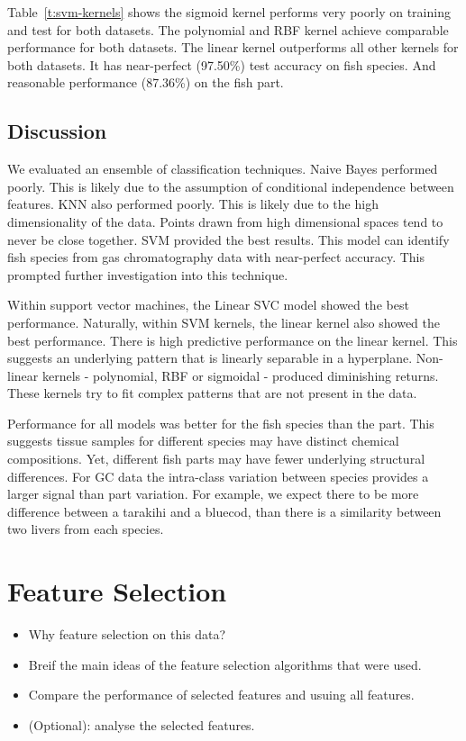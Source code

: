 \documentclass[runningheads]{llncs}
\begin{document}
Table~\ref{t:svm-kernels} shows the sigmoid kernel performs very poorly on training and test for both datasets.
The polynomial and RBF kernel achieve comparable performance for both datasets.
The linear kernel outperforms all other kernels for both datasets.
It has near-perfect (97.50\%) test accuracy on fish species.
And reasonable performance (87.36\%) on the fish part.

\subsection{Discussion}
\label{sec:results-classification-discussion}

We evaluated an ensemble of classification techniques.
Naive Bayes performed poorly.
This is likely due to the assumption of conditional independence between features.
KNN also performed poorly. This is likely due to the high dimensionality of the data.
Points drawn from high dimensional spaces tend to never be close together.
SVM provided the best results.
This model can identify fish species from gas chromatography data with near-perfect accuracy.
This prompted further investigation into this technique.

Within support vector machines, the Linear SVC model showed the best performance.
Naturally, within SVM kernels, the linear kernel also showed the best performance.
There is high predictive performance on the linear kernel.
This suggests an underlying pattern that is linearly separable in a hyperplane.
Non-linear kernels - polynomial, RBF or sigmoidal - produced diminishing returns.
These kernels try to fit complex patterns that are not present in the data.

Performance for all models was better for the fish species than the part.
This suggests tissue samples for different species may have distinct chemical compositions.
Yet, different fish parts may have fewer underlying structural differences.
For GC data the intra-class variation between species provides a larger signal than part variation.
For example, we expect there to be more difference between a tarakihi and a bluecod, than there is a similarity between two livers from each species.


\section{Feature Selection}

\begin{itemize}
    \item Why feature selection on this data? 
    \item Breif the main ideas of the feature selection algorithms that were used. 
    \item Compare the performance of selected features and usuing all features. 
    \item (Optional): analyse the selected features. 
\end{itemize}
\end{document}
